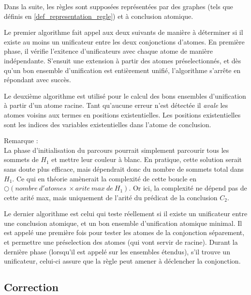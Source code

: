 	Dans la suite, les règles sont supposées représentées par des graphes (tels que
	définis en \ref{def_representation_regle}) et à conclusion atomique.

	Le premier algorithme fait appel aux deux suivants de manière à déterminer si il
	existe au moins un unificateur entre les deux conjonctions d'atomes.
	En première phase, il vérifie l'exitence d'unificateurs avec chaque atome de manière
	indépendante. S'ensuit une extension à partir des atomes préselectionnés, et dès
	qu'un bon ensemble d'unification est entièrement unifié, l'algorithme s'arrête en
	répondant avec succès.
	

	Le deuxième algorithme est utilisé pour le calcul des bons ensembles d'unification à
	partir d'un atome racine. Tant qu'aucune erreur n'est détectée il {\em avale} les atomes
	voisins aux termes en positions existentielles.
	Les positions existentielles sont les indices des variables existentielles dans
	l'atome de conclusion.
	

	Remarque : \\
	La phase d'initialisation du parcours pourrait simplement parcourir tous les sommets
	de $H_{1}$ et mettre leur couleur \`a blanc.
	En pratique, cette solution serait sans doute plus efficace, mais d\'ependrait donc
	du nombre de sommets total dans $H_{1}$.
	Ce qui en th\'eorie am\`enerait la complexit\'e de cette boucle en 
	$\bigcirc(nombre\ d'atomes\ \times arite\ max\ de\ H_{1})$.
	Or ici, la complexit\'e ne d\'epend pas de cette arit\'e max, mais uniquement de
	l'arit\'e du pr\'edicat de la conclusion $C_{2}$.

	Le dernier algorithme est celui qui teste réellement si il existe un unificateur
	entre une conclusion atomique, et un bon ensemble d'unification atomique minimal.
	Il est appelé une première fois pour tester les atomes de la conjonction séparement,
	et permettre une préselection des atomes (qui vont servir de racine).
	Durant la dernière phase (lorsqu'il est appelé sur les ensembles étendus), s'il trouve
	un unificateur, celui-ci assure que la règle peut amener à déclencher la conjonction.
	



\subsection{Correction}\label{grd_correction}

